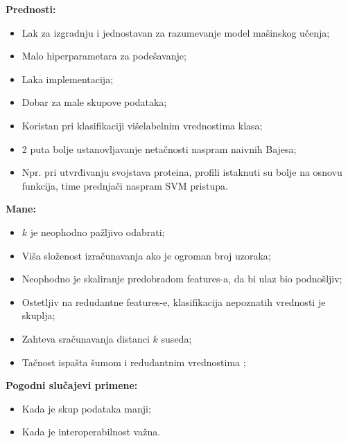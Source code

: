 \documentclass[fontsize=12bp, paper=a4]{scrarticle}
\begin{document}
\textbf{Prednosti:}
\begin{itemize}
    \item Lak za izgradnju i jednostavan za razumevanje model mašinskog učenja;
    \item Malo hiperparametara za podešavanje;
    \item Laka implementacija;
    \item Dobar za male skupove podataka;
    \item Koristan pri klasifikaciji višelabelnim vrednostima klasa;
    \item 2 puta bolje ustanovljavanje netačnosti naspram naivnih Bajesa;
    \item Npr. pri utvrđivanju svojstava proteina, profili istaknuti su bolje na osnovu funkcija, time prednjači naspram SVM pristupa.
\end{itemize}

\textbf{Mane:}
\begin{itemize}
    \item $k$ je neophodno pažljivo odabrati;
    \item Viša složenost izračunavanja ako je ogroman broj uzoraka;
    \item Neophodno je skaliranje predobradom features-a, da bi ulaz bio podnošljiv;
    \item Ostetljiv na redudantne features-e, klasifikacija nepoznatih vrednosti je skuplja;
    \item Zahteva sračunavanja distanci $k$ suseda;
    \item Tačnost ispašta šumom i redudantnim vrednostima ;
\end{itemize}





\textbf{Pogodni slučajevi primene:}
\begin{itemize}
    \item Kada je skup podataka manji;
    \item Kada je interoperabilnost važna.
\end{itemize}
\end{document}
